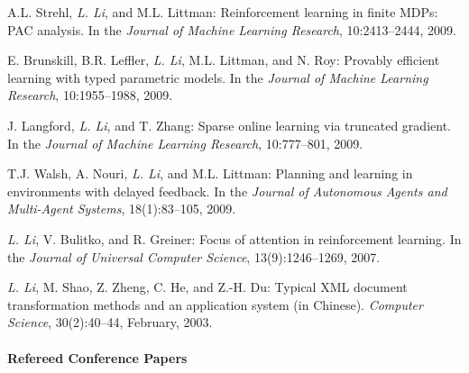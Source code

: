 \documentclass[10pt,twoside,letterpaper]{article}
\newcommand{\selffont}[1]{{\textit{#1}}}
\newcommand{\venuefont}[1]{{\textit{#1}}}
\newcommand{\negitemspace}{\vspace{1mm}}
\newcommand{\myself}{\selffont{L. Li}}
\begin{document}
\begin{compactenum}[(J1)]
\item{A.L. Strehl, \myself, and M.L. Littman:
Reinforcement learning in finite MDPs: PAC analysis.  In the
\venuefont{Journal of Machine Learning Research}, 10:2413--2444, 2009.}

\item{E. Brunskill, B.R. Leffler, \myself, M.L. Littman,
and N. Roy: Provably efficient learning with typed parametric
models.  In the \venuefont{Journal of Machine Learning Research},
10:1955--1988, 2009.}

\item{J. Langford, \myself, and T. Zhang: Sparse online
learning via truncated gradient. In the \venuefont{Journal of Machine
Learning Research}, 10:777--801, 2009.}

\item{T.J. Walsh, A. Nouri, \myself, and M.L. Littman:
Planning and learning in environments with delayed feedback. In
the \venuefont{Journal of Autonomous Agents and Multi-Agent
Systems}, 18(1):83--105, 2009.}

\item{\myself, V. Bulitko, and R. Greiner: Focus of
attention in reinforcement learning. In the \venuefont{Journal of
Universal Computer Science}, 13(9):1246--1269, 2007.}

\item{\myself, M. Shao, Z. Zheng, C. He, and Z.-H. Du:
Typical XML document transformation methods and an application
system (in Chinese). \venuefont{Computer Science}, 30(2):40--44,
February, 2003.}

\end{compactenum}

\paragraph{Refereed Conference Papers} \negitemspace
\end{document}
